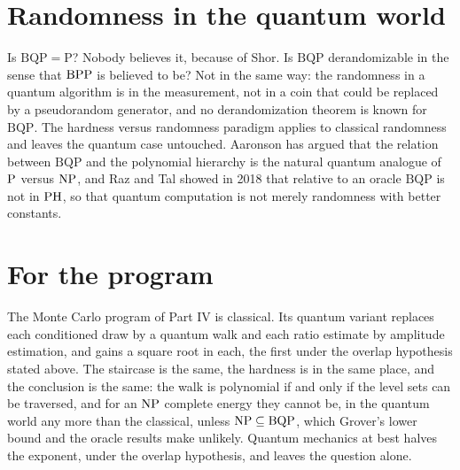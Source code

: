 \section{Randomness in the quantum world}

Is $\mathrm{BQP} = \mathrm{P}$? Nobody believes it, because of Shor. Is $\mathrm{BQP}$ derandomizable in the sense that $\mathrm{BPP}$ is believed to be? Not in the same way: the randomness in a quantum algorithm is in the measurement, not in a coin that could be replaced by a pseudorandom generator, and no derandomization theorem is known for $\mathrm{BQP}$. The hardness versus randomness paradigm applies to classical randomness and leaves the quantum case untouched. Aaronson has argued that the relation between $\mathrm{BQP}$ and the polynomial hierarchy is the natural quantum analogue of $\mathrm{P}$ versus $\mathrm{NP}$, and Raz and Tal showed in 2018 that relative to an oracle $\mathrm{BQP}$ is not in $\mathrm{PH}$, so that quantum computation is not merely randomness with better constants.

\section{For the program}

The Monte Carlo program of Part IV is classical. Its quantum variant replaces each conditioned draw by a quantum walk and each ratio estimate by amplitude estimation, and gains a square root in each, the first under the overlap hypothesis stated above. The staircase is the same, the hardness is in the same place, and the conclusion is the same: the walk is polynomial if and only if the level sets can be traversed, and for an $\mathrm{NP}$ complete energy they cannot be, in the quantum world any more than the classical, unless $\mathrm{NP} \subseteq \mathrm{BQP}$, which Grover's lower bound and the oracle results make unlikely. Quantum mechanics at best halves the exponent, under the overlap hypothesis, and leaves the question alone.
